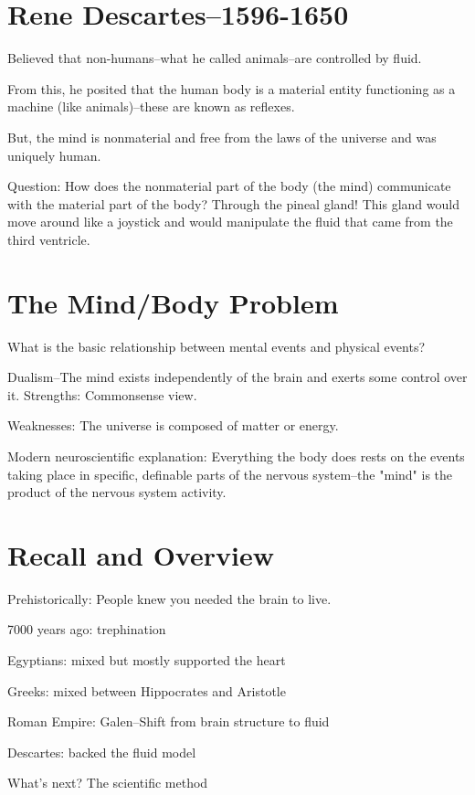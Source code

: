 \section{Rene Descartes--1596-1650}

\begin{coloredlist}
    \item Believed that non-humans--what he called animals--are controlled by fluid.
    \item From this, he posited that the human body is a material entity functioning as a machine (like animals)--these are known as reflexes.
    \item But, the mind is nonmaterial and free from the laws of the universe and was uniquely human.
    \item Question: How does the nonmaterial part of the body (the mind) communicate with the material part of the body? Through the pineal gland! This gland would move around like a joystick and would manipulate the fluid that came from the third ventricle.
\end{coloredlist}

\section{The Mind/Body Problem}

\begin{coloredlist}
    \item What is the basic relationship between mental events and physical events?
    \item Dualism--The mind exists independently of the brain and exerts some control over it.
    Strengths: Commonsense view.
    \item Weaknesses: The universe is composed of matter or energy.
    \item Modern neuroscientific explanation: Everything the body does rests on the events taking place in specific, definable parts of the nervous system--the "mind" is the product of the nervous system activity.
\end{coloredlist}

\section{Recall and Overview}

\begin{coloredlist}
    \item Prehistorically: People knew you needed the brain to live.
    \item 7000 years ago: trephination
    \item Egyptians: mixed but mostly supported the heart
    \item Greeks: mixed between Hippocrates and Aristotle
    \item Roman Empire: Galen--Shift from brain structure to fluid
    \item Descartes: backed the fluid model
    \item What's next? The scientific method
\end{coloredlist}

